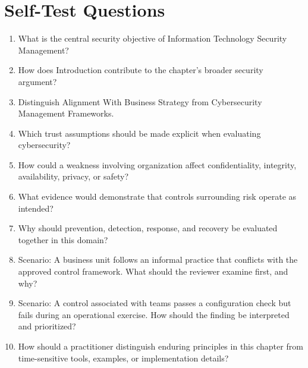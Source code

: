 \documentclass[11pt]{article}
\begin{document}
\section*{Self-Test Questions}
\begin{enumerate}
\item What is the central security objective of Information Technology Security Management?
\item How does Introduction contribute to the chapter's broader security argument?
\item Distinguish Alignment With Business Strategy from Cybersecurity Management Frameworks.
\item Which trust assumptions should be made explicit when evaluating cybersecurity?
\item How could a weakness involving organization affect confidentiality, integrity, availability, privacy, or safety?
\item What evidence would demonstrate that controls surrounding risk operate as intended?
\item Why should prevention, detection, response, and recovery be evaluated together in this domain?
\item Scenario: A business unit follows an informal practice that conflicts with the approved control framework. What should the reviewer examine first, and why?
\item Scenario: A control associated with teams passes a configuration check but fails during an operational exercise. How should the finding be interpreted and prioritized?
\item How should a practitioner distinguish enduring principles in this chapter from time-sensitive tools, examples, or implementation details?
\end{enumerate}
\end{document}

